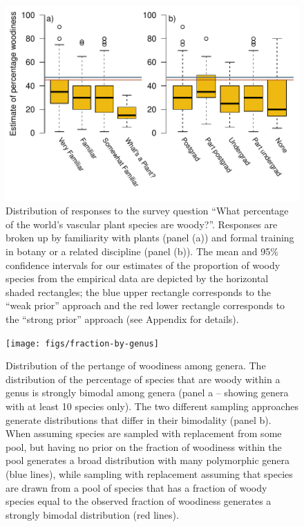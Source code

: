\documentclass[12pt]{article}
\begin{document}



\begin{figure}[p]
  \centering
  \includegraphics{figs/survey-results}
  \caption{Distribution of responses to the survey question ``What
    percentage of the world's vascular plant species are
    woody?''. Responses are broken up by familiarity with plants
    (panel (a)) and formal training in botany or a related discipline
    (panel (b)). The mean and 95\% confidence intervals for our
    estimates of the proportion of woody species from the empirical
    data are depicted by the horizontal shaded rectangles; the blue
    upper rectangle corresponds to the ``weak prior'' approach and the
    red lower rectangle corresponds to the ``strong prior'' approach
    (see Appendix for details).}
  \label{fig:survey}
\end{figure}

\begin{figure}[p]
  \centering
  \texttt{[image: figs/fraction-by-genus]}
  \caption{Distribution of the pertange of woodiness among genera.
    The distribution of the percentage of species that are woody within
    a genus is strongly bimodal among genera (panel a -- showing
    genera with at least 10 species only).
    The two different sampling approaches generate distributions that
    differ in their bimodality (panel b). When assuming species are
    sampled with replacement from some pool, but having no prior on
    the fraction of woodiness within the pool generates a broad
    distribution with many polymorphic genera (blue lines), while
    sampling with replacement assuming that species are drawn from a
    pool of species that has a fraction of woody species equal to the
    observed fraction of woodiness generates a strongly bimodal
    distribution (red lines).}
  \label{fig:distribution-genera}
\end{figure}
\end{document}

